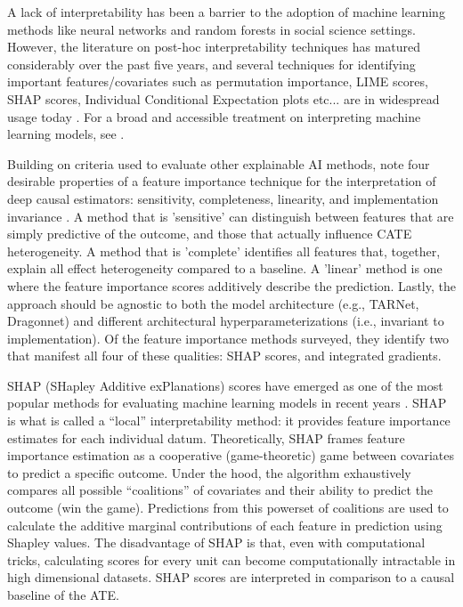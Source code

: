 A lack of interpretability has been a barrier to the adoption of machine learning methods like neural networks and random forests in social science settings. However, the literature on post-hoc interpretability techniques has matured considerably over the past five years, and several techniques for identifying important features/covariates such as permutation importance, LIME scores, SHAP scores, Individual Conditional Expectation plots etc... are in widespread usage today \citep{altmann2010,goldstein2017,lundberg2017,ribeiro2016should}. For a broad and accessible treatment on interpreting machine learning models, see \citet{molnar2022interpretable}.  

Building on criteria used to evaluate other explainable AI methods, \citet{crabbe2022benchmarking} note four desirable properties of a feature importance technique for the interpretation of deep causal estimators: sensitivity, completeness, linearity, and implementation invariance \citep{sundararajan2017axiomatic}.  A method that is 'sensitive' can distinguish between features that are simply predictive of the outcome, and those that actually influence CATE heterogeneity. A method that is 'complete' identifies all features that, together, explain all effect heterogeneity compared to a baseline. A 'linear' method is one where the feature importance scores additively describe the prediction. Lastly, the approach should be agnostic to both the model architecture (e.g., TARNet, Dragonnet) and different architectural hyperparameterizations (i.e., invariant to implementation). Of the feature importance methods surveyed, they identify two that manifest all four of these qualities: SHAP scores, and integrated gradients.

SHAP (SHapley Additive exPlanations) scores have emerged as one of the most popular methods for evaluating machine learning models in recent years \citep{lundberg2017}. SHAP is what is called a  “local” interpretability method: it provides feature importance estimates for each individual datum. Theoretically, SHAP frames feature importance estimation as a cooperative (game-theoretic) game between covariates to predict a specific outcome. Under the hood, the algorithm exhaustively compares all possible “coalitions” of covariates and their ability to predict the outcome (win the game). Predictions from this powerset of coalitions are used to calculate the additive marginal contributions of each feature in prediction using Shapley values. The disadvantage of SHAP is that, even with computational tricks, calculating scores for every unit can become computationally intractable in high dimensional datasets. SHAP scores are interpreted in comparison to a causal baseline of the ATE.

